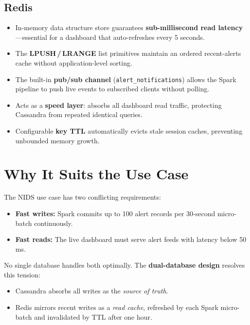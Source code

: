 \documentclass[12pt,a4paper]{report}
\begin{document}
\subsection{Redis}
\begin{itemize}
  \item In-memory data structure store guarantees
        \textbf{sub-millisecond read latency}---essential for a dashboard
        that auto-refreshes every 5 seconds.
  \item The \textbf{LPUSH\,/\,LRANGE} list primitives maintain an ordered
        recent-alerts cache without application-level sorting.
  \item The built-in \textbf{pub/sub channel}
        (\texttt{alert\_notifications}) allows the Spark pipeline to push
        live events to subscribed clients without polling.
  \item Acts as a \textbf{speed layer}: absorbs all dashboard read traffic,
        protecting Cassandra from repeated identical queries.
  \item Configurable \textbf{key TTL} automatically evicts stale session
        caches, preventing unbounded memory growth.
\end{itemize}

\section{Why It Suits the Use Case}
The NIDS use case has two conflicting requirements:
\begin{itemize}
  \item \textbf{Fast writes:} Spark commits up to 100 alert records per
        30-second micro-batch continuously.
  \item \textbf{Fast reads:} The live dashboard must serve alert feeds with
        latency below 50 ms.
\end{itemize}
No single database handles both optimally.  The
\textbf{dual-database design} resolves this tension:
\begin{itemize}
  \item Cassandra absorbs all writes as the \textit{source of truth}.
  \item Redis mirrors recent writes as a \textit{read cache}, refreshed by
        each Spark micro-batch and invalidated by TTL after one hour.
\end{itemize}
\end{document}

